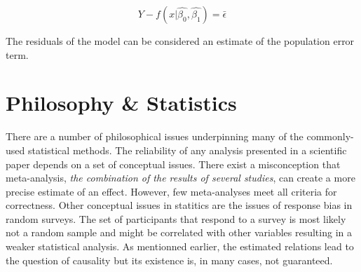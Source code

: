 \documentclass{article}
\begin{document}
$$
    Y - f(x | \hat{\beta_{0}}, \hat{\beta_{1}}) = \bar{\epsilon}
$$

The residuals of the model can be considered an estimate of the population error term.

\section{Philosophy \& Statistics}

There are a number of philosophical issues underpinning many of the commonly-used
statistical methods. The reliability of any analysis presented in a scientific paper
depends on a set of conceptual issues. There exist a misconception that meta-analysis,
\textit{the combination of the results of several studies}, can create a more precise
estimate of an effect. However, few meta-analyses meet all criteria for correctness.
Other conceptual issues in statitics are the issues of response bias in random surveys.
The set of participants that respond to a survey is most likely not a random sample and
might be correlated with other variables resulting in a weaker statistical analysis. As
mentionned earlier, the estimated relations lead to the question of causality but its
existence is, in many cases, not guaranteed.
\end{document}
